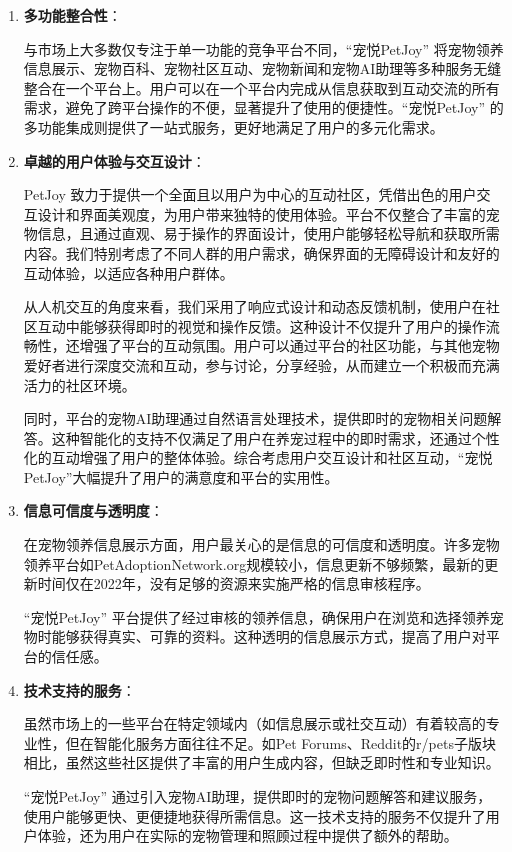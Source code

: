 \begin{enumerate}
    \item \textbf{多功能整合性}：

    与市场上大多数仅专注于单一功能的竞争平台不同，“宠悦PetJoy” 将宠物领养信息展示、宠物百科、宠物社区互动、宠物新闻和宠物AI助理等多种服务无缝整合在一个平台上。用户可以在一个平台内完成从信息获取到互动交流的所有需求，避免了跨平台操作的不便，显著提升了使用的便捷性。“宠悦PetJoy” 的多功能集成则提供了一站式服务，更好地满足了用户的多元化需求。

    \item \textbf{卓越的用户体验与交互设计}：

    PetJoy 致力于提供一个全面且以用户为中心的互动社区，凭借出色的用户交互设计和界面美观度，为用户带来独特的使用体验。平台不仅整合了丰富的宠物信息，且通过直观、易于操作的界面设计，使用户能够轻松导航和获取所需内容。我们特别考虑了不同人群的用户需求，确保界面的无障碍设计和友好的互动体验，以适应各种用户群体。

    从人机交互的角度来看，我们采用了响应式设计和动态反馈机制，使用户在社区互动中能够获得即时的视觉和操作反馈。这种设计不仅提升了用户的操作流畅性，还增强了平台的互动氛围。用户可以通过平台的社区功能，与其他宠物爱好者进行深度交流和互动，参与讨论，分享经验，从而建立一个积极而充满活力的社区环境。

    同时，平台的宠物AI助理通过自然语言处理技术，提供即时的宠物相关问题解答。这种智能化的支持不仅满足了用户在养宠过程中的即时需求，还通过个性化的互动增强了用户的整体体验。综合考虑用户交互设计和社区互动，“宠悦PetJoy”大幅提升了用户的满意度和平台的实用性。

    \item \textbf{信息可信度与透明度}：

    在宠物领养信息展示方面，用户最关心的是信息的可信度和透明度。许多宠物领养平台如PetAdoptionNetwork.org规模较小，信息更新不够频繁，最新的更新时间仅在2022年，没有足够的资源来实施严格的信息审核程序。

    “宠悦PetJoy” 平台提供了经过审核的领养信息，确保用户在浏览和选择领养宠物时能够获得真实、可靠的资料。这种透明的信息展示方式，提高了用户对平台的信任感。

    \item \textbf{技术支持的服务}：

    虽然市场上的一些平台在特定领域内（如信息展示或社交互动）有着较高的专业性，但在智能化服务方面往往不足。如Pet Forums、Reddit的r/pets子版块相比，虽然这些社区提供了丰富的用户生成内容，但缺乏即时性和专业知识。

    “宠悦PetJoy” 通过引入宠物AI助理，提供即时的宠物问题解答和建议服务，使用户能够更快、更便捷地获得所需信息。这一技术支持的服务不仅提升了用户体验，还为用户在实际的宠物管理和照顾过程中提供了额外的帮助。

\end{enumerate}


